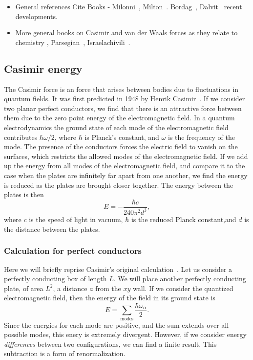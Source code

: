 \begin{itemize}
\item General references Cite Books - Milonni~\cite{Milonni1994}, Milton~\cite{Milton2001}.  Bordag~\cite{Bordag2009}, Dalvit~\cite{Dalvit2011} recent developments.  
\item More general books on Casimir and van der Waals forces as they relate to chemistry , Parsegian~\cite{Parsegian2006}, Israelachivili~\cite{Israelachvili2011}.
\end{itemize}


\subsection{Casimir energy}

The Casimir force is an force that arises between bodies due to fluctuations in quantum fields.  It was first predicted in 1948 by Henrik Casimir~\cite{Casimir1948}.  If we consider two planar perfect conductors, we find that there is an attractive force between them due to the zero point energy of the electromagnetic field.  In a quantum electrodynamics the ground state of each mode of the electromagnetic field contributes $\hbar\omega/2$, where $\hbar$ is Planck's constant, and $\omega$ is the frequency of the mode.  The presence of the conductors forces the electric field to vanish on the surfaces, which restricts the allowed modes of the electromagnetic field. If we add up the energy from all modes of the electromagnetic field, and compare it to the case when the plates are infinitely far apart from one another, we find the energy is reduced as the plates are brought closer together.  The energy between the plates is then
\begin{equation}
  E = -\frac{\hbar c}{240\pi^2 d^3},
\end{equation}
where $c$ is the speed of light in vacuum, $\hbar$ is the reduced Planck constant,and $d$ is the distance between the plates.  

\subsubsection{Calculation for perfect conductors}

Here we will briefly reprise Casimir's original calculation~\cite{Casimir1948}.  Let us consider a perfectly conducting box of length $L$.  We will place another perfectly conducting plate, of area $L^2$, a distance $a$ from the $xy$ wall.   
If we consider the quantized electromagnetic field,  then the energy of the field in its ground state is
\begin{equation}
E = \sum_{\text{modes}}\frac{\hbar\omega_\alpha}{2}.
\end{equation}
Since the energies for each mode are positive, and the sum extends over all possible modes, this enery is extremely divergent.  However, if we consider energy \emph{differences} between two configurations, we can find a finite result.  This subtraction is a form of renormalization.  

